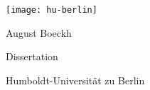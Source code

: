 
\begin{titlepage}

\hfill\texttt{[image: hu-berlin]}\\ %
\vfill %
\begin{center}
\Large%
August Boeckh\par
Dissertation
\end{center}
\vfill%
Humboldt-Universität zu Berlin


\end{titlepage}